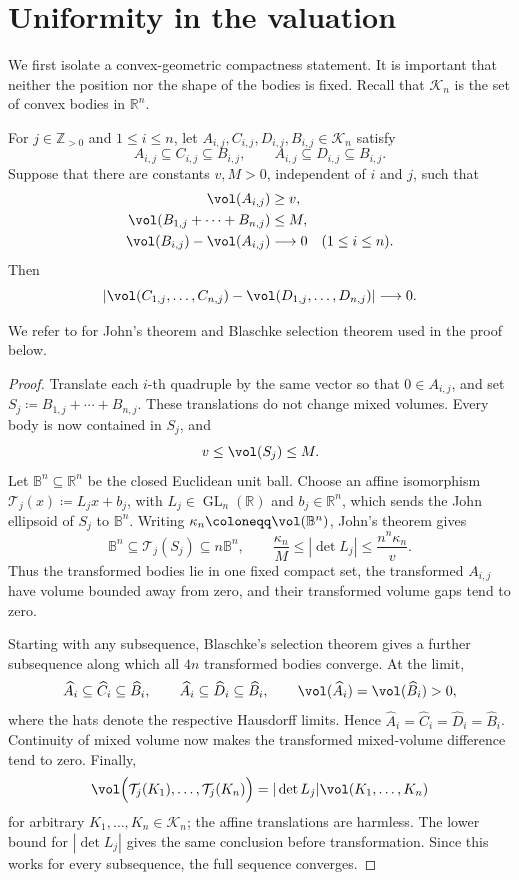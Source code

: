 \documentclass[11pt,a4paper]{amsart}
\newcommand{\Kconv}{\mathcal K_n}
\begin{document}
\section{Uniformity in the valuation}

We first isolate a convex-geometric compactness statement.  It is important that neither the position nor the shape of the bodies is fixed.
Recall that $\mathcal{K}_n$ is the set of convex bodies in $\mathbb{R}^n$.

\begin{lemma}\label{lem:uniform-sandwich}
For $j\in\mathbb Z_{>0}$ and $1\leq i\leq n$, let $A_{i,j},C_{i,j},D_{i,j},B_{i,j}\in\Kconv$ satisfy
\[
 A_{i,j}\subseteq C_{i,j}\subseteq B_{i,j},
 \qquad
 A_{i,j}\subseteq D_{i,j}\subseteq B_{i,j}.
\]
Suppose that there are constants $v,M>0$, independent of $i$ and $j$, such that
\begin{align*}
 \vol(A_{i,j})&\geq v,\\
 \vol(B_{1,j}+\cdots+B_{n,j})&\leq M,\\
 \vol(B_{i,j})-\vol(A_{i,j})&\longrightarrow0
 \quad(1\leq i\leq n).
\end{align*}
Then
\[
 \left|\vol(C_{1,j},\ldots,C_{n,j})
       -\vol(D_{1,j},\ldots,D_{n,j})\right|\longrightarrow0.
\]
\end{lemma}
We refer to \cite{Sch14} for John's theorem and Blaschke selection theorem used in the proof below.
\begin{proof}
Translate each $i$-th quadruple by the same vector so that $0\in A_{i,j}$,
and set $S_j\coloneqq B_{1,j}+\cdots+B_{n,j}$.  These translations do not change
mixed volumes.  Every body is now contained in $S_j$, and
\[
 v\leq\vol(S_j)\leq M.
\]
Let $\mathbb B^n\subseteq\mathbb R^n$ be the closed Euclidean unit ball.
Choose an affine isomorphism
$\mathcal T_j(x)\coloneqq L_jx+b_j$, with
$L_j\in\operatorname{GL}_n(\mathbb R)$ and $b_j\in\mathbb R^n$, which
sends the John ellipsoid of $S_j$ to $\mathbb B^n$.  Writing
$\kappa_n\coloneqq \vol(\mathbb B^n)$, John's theorem gives
\[
 \mathbb B^n\subseteq \mathcal T_j(S_j)\subseteq n\mathbb B^n,
 \qquad
 \frac{\kappa_n}{M}\leq|\det L_j|
 \leq\frac{n^n\kappa_n}{v}.
\]
Thus the transformed bodies lie in one fixed compact set, the transformed
$A_{i,j}$ have volume bounded away from zero, and their transformed volume
gaps tend to zero.

Starting with any subsequence, Blaschke's selection theorem gives a further
subsequence along which all $4n$ transformed bodies converge.  At the limit,
\[
 \widehat A_i\subseteq\widehat C_i\subseteq\widehat B_i,
 \qquad
 \widehat A_i\subseteq\widehat D_i\subseteq\widehat B_i,
 \qquad \vol(\widehat A_i)=\vol(\widehat B_i)>0,
\]
where the hats denote the respective Hausdorff limits.  Hence
$\widehat A_i=\widehat C_i=\widehat D_i=\widehat B_i$.  Continuity of mixed
volume now makes the transformed mixed-volume difference tend to zero.
Finally,
\[
 \vol\Bigl(\mathcal T_j(K_1),\ldots,\mathcal T_j(K_n)\Bigr) =|\det L_j|\vol(K_1,\ldots,K_n)
\]
for arbitrary $K_1,\ldots,K_n\in\Kconv$; the affine translations are harmless.  The lower bound for
$|\det L_j|$ gives the same conclusion before transformation. Since this works for every subsequence, the full sequence converges.  
\end{proof}
\end{document}
